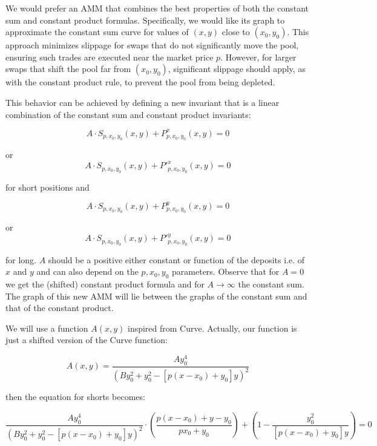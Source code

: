\documentclass{article}
\begin{document}
We would prefer an AMM that combines the best properties of both the constant sum and constant product formulas. Specifically, we would like its graph to approximate the constant sum curve for values of $(x,y)$ close to $(x_0,y_0)$. This approach minimizes slippage for swaps that do not significantly move the pool, ensuring such trades are executed near the market price $p$.
However, for larger swaps that shift the pool far from $(x_0,y_0)$, significant slippage should apply, as with the constant product rule, to prevent the pool from being depleted.

This behavior can be achieved by defining a new invariant that is a linear combination of the constant sum and constant product invariants:

\begin{equation}
A \cdot S_{p,x_0,y_0}(x,y) + P^x _{p,x_0,y_0}(x,y) = 0
\end{equation}

or
\begin{equation}
A\cdot S_{p,x_0,y_0}(x,y) + P'^x _{p,x_0,y_0}(x,y) = 0
\end{equation}

for short positions and

\begin{equation}
A\cdot S_{p,x_0,y_0}(x,y) + P^y _{p,x_0,y_0}(x,y) = 0
\end{equation}

or
\begin{equation}
A\cdot S_{p,x_0,y_0}(x,y) + P'^y _{p,x_0,y_0}(x,y) = 0
\end{equation}

for long. $A$ should be a positive either constant or function of the deposits i.e. of $x$ and $y$ and can also depend on the $p,x_0,y_0$ parameters. Observe that for $A=0$ we get the (shifted) constant product formula and for $A \rightarrow\infty$ the constant sum. The graph of this new AMM will lie between the graphs of the constant sum and that of the constant product.


We will use a function $A(x,y)$ inspired from Curve. Actually, our function is just a shifted version of the Curve function:

\begin{equation}
A(x,y)=\frac{Ay_0^4}{\left( By_0^2+y_0^2-[p(x-x_0)+y_0]y \right)^2}
\end{equation}

then the equation for shorts becomes:

\begin{equation}\label{first}
\frac{Ay_0^4}{\left( By_0^2+y_0^2-[p(x-x_0)+y_0]y \right)^2}\cdot \left( \frac{p(x-x_0)+y-y_0}{px_0+y_0} \right) + \left( 1 - \frac{y_0^2}{[p(x-x_0)+y_0]y} \right) = 0
\end{equation}
\end{document}
